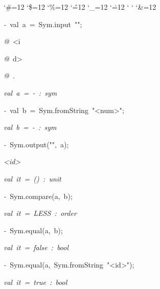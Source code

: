 \begin{list}{}
{\setlength{\leftmargin}{\leftmargini}
\setlength{\rightmargin}{0cm}
\setlength{\itemindent}{0cm}
\setlength{\listparindent}{0cm}
\setlength{\itemsep}{0cm}
\setlength{\parsep}{0cm}
\setlength{\labelsep}{0cm}
\setlength{\labelwidth}{0cm}
\catcode`\#=12
\catcode`\$=12
\catcode`\%=12
\catcode`\^=12
\catcode`\_=12
\catcode`\.=12
\catcode`
\catcode`
\catcode`\&=12
\ttfamily}
\small
\item[]\textsl{-\ }val\ a\ =\ Sym.input\ "";
\item[]\textsl{@\ }<i
\item[]\textsl{@\ }d>
\item[]\textsl{@\ }.
\item[]\textsl{val\ a\ =\ -\ :\ sym}
\item[]\textsl{-\ }val\ b\ =\ Sym.fromString\ "<num>";
\item[]\textsl{val\ b\ =\ -\ :\ sym}
\item[]\textsl{-\ }Sym.output("",\ a);
\item[]\textsl{<id>}
\item[]\textsl{val\ it\ =\ ()\ :\ unit}
\item[]\textsl{-\ }Sym.compare(a,\ b);
\item[]\textsl{val\ it\ =\ LESS\ :\ order}
\item[]\textsl{-\ }Sym.equal(a,\ b);
\item[]\textsl{val\ it\ =\ false\ :\ bool}
\item[]\textsl{-\ }Sym.equal(a,\ Sym.fromString\ "<id>");
\item[]\textsl{val\ it\ =\ true\ :\ bool}
\end{list}

